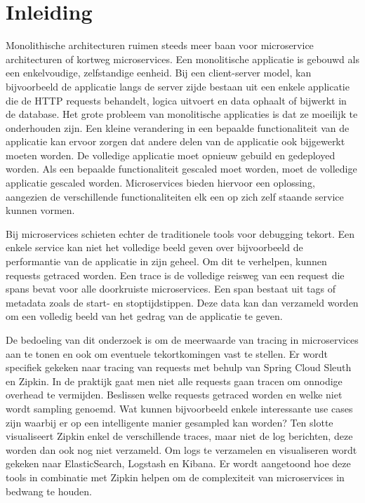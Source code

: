 
\chapter{Inleiding}
\label{ch:inleiding}

Monolithische architecturen ruimen steeds meer baan voor microservice architecturen of kortweg microservices. Een monolitische applicatie is gebouwd als een enkelvoudige, zelfstandige eenheid. Bij een client-server model, kan bijvoorbeeld de applicatie langs de server zijde bestaan uit een enkele applicatie die de HTTP requests behandelt, logica uitvoert en data ophaalt of bijwerkt in de database. Het grote probleem van monolitische applicaties is dat ze moeilijk te onderhouden zijn. Een kleine verandering in een bepaalde functionaliteit van de applicatie kan ervoor zorgen dat andere delen van de applicatie ook bijgewerkt moeten worden. De volledige applicatie moet opnieuw gebuild en gedeployed worden. Als een bepaalde functionaliteit gescaled moet worden, moet de volledige applicatie gescaled worden. Microservices bieden hiervoor een oplossing, aangezien de verschillende functionaliteiten elk een op zich zelf staande service kunnen vormen.

Bij microservices schieten echter de traditionele tools voor debugging tekort. Een enkele service kan niet het volledige beeld geven over bijvoorbeeld de performantie van de applicatie in zijn geheel. Om dit te verhelpen, kunnen requests getraced worden. Een trace is de volledige reisweg van een request die spans bevat voor alle doorkruiste microservices. Een span bestaat uit tags of metadata zoals de start- en stoptijdstippen. Deze data kan dan verzameld worden om een volledig beeld van het gedrag van de applicatie te geven.

De bedoeling van dit onderzoek is om de meerwaarde van tracing in microservices aan te tonen en ook om eventuele tekortkomingen vast te stellen. Er wordt specifiek gekeken naar tracing van requests met behulp van Spring Cloud Sleuth en Zipkin. In de praktijk gaat men niet alle requests gaan tracen om onnodige overhead te vermijden. Beslissen welke requests getraced worden en welke niet wordt sampling genoemd. Wat kunnen bijvoorbeeld enkele interessante use cases zijn waarbij er op een intelligente manier gesampled kan worden? Ten slotte visualiseert Zipkin enkel de verschillende traces, maar niet de log berichten, deze worden dan ook nog niet verzameld. Om logs te verzamelen en visualiseren wordt gekeken naar ElasticSearch, Logstash en Kibana. Er wordt aangetoond hoe deze tools in combinatie met Zipkin helpen om de complexiteit van microservices in bedwang te houden.

